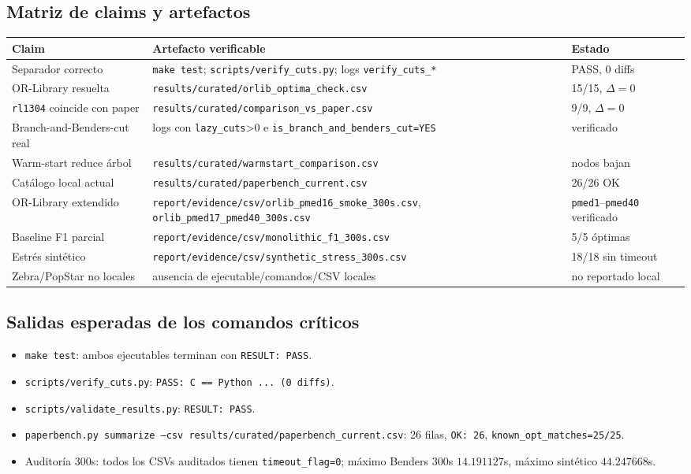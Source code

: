 \subsection{Matriz de claims y artefactos}
\begin{center}\small
\begin{tabular}{p{}p{}p{}}
\toprule
Claim & Artefacto verificable & Estado \\
\midrule
Separador correcto & \texttt{make test}; \texttt{scripts/verify\_cuts.py}; logs
\texttt{verify\_cuts\_*} & PASS, 0 diffs \\
OR-Library resuelta & \texttt{results/curated/orlib\_optima\_check.csv} & 15/15, $\Delta=0$ \\
\texttt{rl1304} coincide con paper & \texttt{results/curated/comparison\_vs\_paper.csv} & 9/9, $\Delta=0$ \\
Branch-and-Benders-cut real & logs con \texttt{lazy\_cuts}>0 e
\texttt{is\_branch\_and\_benders\_cut=YES} & verificado \\
Warm-start reduce árbol & \texttt{results/curated/warmstart\_comparison.csv} & nodos bajan \\
Catálogo local actual & \texttt{results/curated/paperbench\_current.csv} & 26/26 OK \\
OR-Library extendido & \texttt{report/evidence/csv/orlib\_pmed16\_smoke\_300s.csv},
\texttt{orlib\_pmed17\_pmed40\_300s.csv} & \texttt{pmed1}--\texttt{pmed40} verificado \\
Baseline F1 parcial & \texttt{report/evidence/csv/monolithic\_f1\_300s.csv} & 5/5 óptimas \\
Estrés sintético & \texttt{report/evidence/csv/synthetic\_stress\_300s.csv} & 18/18 sin timeout \\
Zebra/PopStar no locales & ausencia de ejecutable/comandos/CSV locales & no reportado local \\
\bottomrule
\end{tabular}
\end{center}

\subsection{Salidas esperadas de los comandos críticos}
\begin{itemize}[noitemsep]
  \item \texttt{make test}: ambos ejecutables terminan con \texttt{RESULT: PASS}.
  \item \texttt{scripts/verify\_cuts.py}: \texttt{PASS: C == Python ... (0 diffs)}.
  \item \texttt{scripts/validate\_results.py}: \texttt{RESULT: PASS}.
  \item \texttt{paperbench.py summarize --csv results/curated/paperbench\_current.csv}: 26 filas,
        \texttt{OK: 26}, \texttt{known\_opt\_matches=25/25}.
  \item Auditoría 300s: todos los CSVs auditados tienen \texttt{timeout\_flag=0}; máximo Benders
        300s $14.191127$s, máximo sintético $44.247668$s.
\end{itemize}

